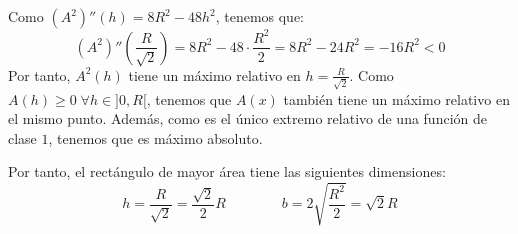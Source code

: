 \documentclass[12pt]{article}
\begin{document}
\begin{ejercicio}
    Como $(A^2)''(h)=8R^2 -48h^2$, tenemos que:
    \begin{equation*}
        (A^2)''\left(\frac{R}{\sqrt{2}}\right) = 8R^2 -48\cdot \frac{R^2}{2} = 8R^2 - 24R^2 = -16R^2 <0
    \end{equation*}
    Por tanto, $A^2(h)$ tiene un máximo relativo en $h=\frac{R}{\sqrt{2}}$. Como $A(h)\geq 0\;\forall h\in ]0,R[$, tenemos que $A(x)$ también tiene un máximo relativo en el mismo punto. Además, como es el único extremo relativo de una función de clase $1$, tenemos que es máximo absoluto.

    Por tanto, el rectángulo de mayor área tiene las siguientes dimensiones:
    \begin{equation*}
        h=\frac{R}{\sqrt{2}}=\frac{\sqrt{2}}{2}R \qquad \qquad b=2\sqrt{\frac{R^2}{2}} = \sqrt{2}R
    \end{equation*}
\end{ejercicio}
\end{document}

